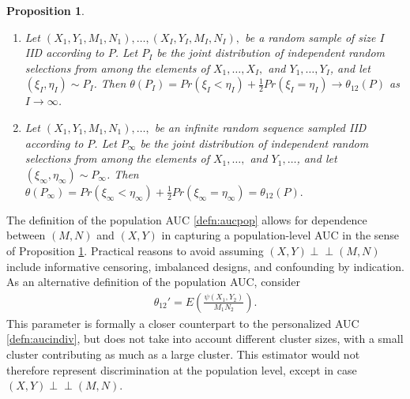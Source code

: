 \documentclass[12pt]{article}
\DeclareMathOperator{\AUC}{AUC}
\newcommand{\I}{I}
\newcommand{\E}{E}
\renewcommand{\P}{P}
\newcommand{\cind}{\perp \!\!\! \perp}
\newcommand{\aucpop}{\theta_{12}}%
\newcommand{\Kernel}{\psi}
\newcommand{\seqspace}{V}%
\newtheorem{proposition}[theorem]{Proposition}
\newtheorem{lemma}[theorem]{Lemma}
\newcommand{\comment}[1]{
  \iftoggle{commenttoggle}{
    {\normalsize{\color{red}{ #1}}\normalsize}
  }
  {}
}
\begin{document}
\begin{proposition}
  \label{proposition:aucpop}
  \begin{enumerate}
  \item Let $(X_1,Y_1,M_1,N_1),\ldots,(X_\I,Y_\I,M_\I,N_\I),$
    be a random sample of size $\I$ IID according to $\P$. Let $\P_\I$ be
    the joint distribution of independent random selections from
    among the elements of $X_1,\ldots,X_\I,$ and $Y_1,\ldots,Y_\I$, and
    let $(\xi_\I,\eta_\I)\sim\P_\I$. Then
    $\theta(\P_\I)=Pr(\xi_\I<\eta_\I)+\frac{1}{2}Pr(\xi_I=\eta_I) \to \theta_{12}(\P)$
    as $\I\to\infty$.
  \item Let $(X_1,Y_1,M_1,N_1),\ldots,$
    be an infinite random sequence sampled IID according to $\P$. Let $\P_\infty$ be
    the joint distribution of independent random selections from
    among the elements of $X_1,\ldots,$ and $Y_1,\ldots$, and
    let $(\xi_\infty,\eta_\infty)\sim\P_\infty$. Then
    $\theta(\P_\infty)=Pr(\xi_\infty<\eta_\infty)+\frac{1}{2}Pr(\xi_\infty=\eta_\infty)=\theta_{12}(\P).$    
  \end{enumerate}
\end{proposition}


  The definition of the population AUC \eqref{defn:aucpop} allows for
  dependence between $(M,N)$ and $(X,Y)$ in capturing a
  population-level AUC in the sense of Proposition
  \ref{proposition:aucpop}. Practical reasons to avoid assuming
  $(X,Y)\cind (M,N)$ %
  include informative censoring, imbalanced designs, and confounding by indication. As an alternative definition of the population AUC,
  consider
  \begin{align}
  \aucpop'=\E\left(\frac{\psi(X_1,Y_2)}{M_1N_2} \right).\label{defn:aucalternative}
  \end{align}
  This parameter is formally a closer counterpart to the personalized
  AUC \eqref{defn:aucindiv}, but does not take into account different
  cluster sizes, with a small cluster contributing as much as a large
  cluster.  This
  estimator would not therefore represent discrimination at the population level,
  except in case $(X,Y)\cind (M,N)$.
\end{document}

